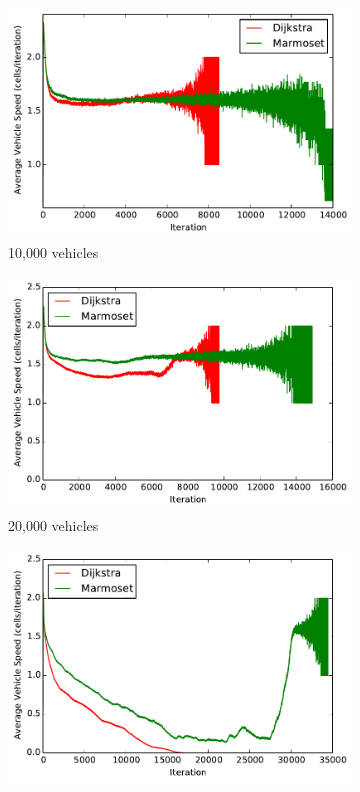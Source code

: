 \documentclass[ %
                    author={Alexander Hill},
                supervisor={Dr. Benjamin Sach},
                    degree={MEng},
                     title={MARMOSET},
                  subtitle={Multi-Agent Route Management using Online Simulation for Efficient Transportation},
                      type={research},
                      year={2016} ]{dissertation}
\begin{document}
\begin{figure}[p]
    \centering
    \begin{subfigure}[b]{0.3\textwidth}
        \centering
        \includegraphics[width=\textwidth]{sdv-dij-comp-10k}
        \caption{10,000 vehicles}
    \end{subfigure}
    \begin{subfigure}[b]{0.3\textwidth}
        \centering
        \includegraphics[width=\textwidth]{sdv-dij-comp-20k}
        \caption{20,000 vehicles}
    \end{subfigure}
    \begin{subfigure}[b]{0.3\textwidth}
        \centering
        \includegraphics[width=\textwidth]{sdv-dij-comp-50k}

\end{subfigure}
\end{figure}
\end{document}
